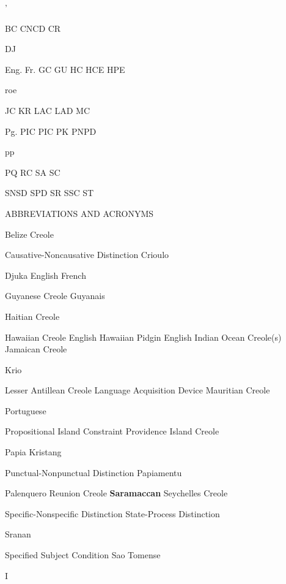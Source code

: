 \begin{refsection}

'

BC CNCD CR

DJ

Eng. Fr. GC GU HC HCE HPE

roe

JC KR LAC LAD MC

Pg. PIC PIC PK PNPD

pp

PQ RC SA SC

SNSD SPD SR SSC ST

ABBREVIATIONS AND ACRONYMS

Belize Creole

Causative-Noncausative Distinction Crioulo

Djuka English French

Guyanese Creole Guyanais

Haitian Creole

Hawaiian Creole English Hawaiian Pidgin English Indian Ocean Creole(s) Jamaican Creole

Krio

Lesser Antillean Creole Language Acquisition Device Mauritian Creole

Portuguese

Propositional Island Constraint Providence Island Creole

Papia Kristang

Punctual-Nonpunctual Distinction Papiamentu

Palenquero Reunion Creole \textbf{Saramaccan} Seychelles Creole

Specific-Nonspecific Distinction State-Process Distinction

Sranan

Specified Subject Condition Sao Tomense

I


\printbibliography[heading=subbibliography]
\end{refsection}

